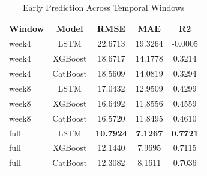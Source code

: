 \begin{table}[htbp]
\centering
\caption{Early Prediction Across Temporal Windows}
\label{tab:early}
\begin{tabular}{lcccc}
\hline
Window & Model & RMSE & MAE & R2 \\
\hline
week4 & LSTM & 22.6713 & 19.3264 & -0.0005 \\
week4 & XGBoost & 18.6717 & 14.1778 & 0.3214 \\
week4 & CatBoost & 18.5609 & 14.0819 & 0.3294 \\
week8 & LSTM & 17.0432 & 12.9509 & 0.4299 \\
week8 & XGBoost & 16.6492 & 11.8556 & 0.4559 \\
week8 & CatBoost & 16.5720 & 11.8495 & 0.4610 \\
full & LSTM & \textbf{10.7924} & \textbf{7.1267} & \textbf{0.7721} \\
full & XGBoost & 12.1440 & 7.9695 & 0.7115 \\
full & CatBoost & 12.3082 & 8.1611 & 0.7036 \\
\hline
\end{tabular}
\end{table}
